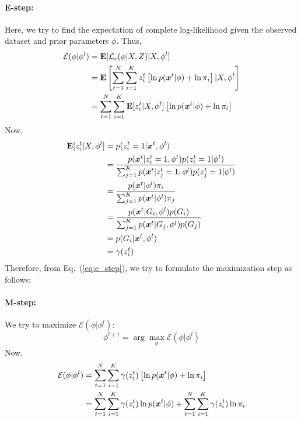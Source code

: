 \paragraph{E-step:} Here, we try to find the expectation of complete log-likelihood given the observed dataset and prior parameters $\phi$. Thus,
\begin{align}\label{eq:e_step}
	\mathcal{E}(\phi|\phi^l) &= \mathbf{E}[\mathcal{L}_c(\phi|X,Z)|X,\phi^l] \nonumber\\
	&= \mathbf{E}\left[\sum_{t=1}^{N} \sum_{i=1}^{K} z^t_i \left[\ln p(\boldsymbol{x}^t|\phi) + \ln \pi_i\right]|X,\phi^l\right] \nonumber\\
	&= \sum_{t=1}^{N} \sum_{i=1}^{K} \mathbf{E}[z^t_i|X,\phi^l]\left[\ln p(\boldsymbol{x}^t|\phi) + \ln \pi_i\right]
\end{align}
Now,
\begin{equation}
	\begin{split}
		\mathbf{E}[z^t_i|X,\phi^l] &= p(z^t_i = 1 | \boldsymbol{x}^t, \phi^l)\\
		&= \frac{p(\boldsymbol{x}^t|z^t_i=1,\phi^l)p(z^t_i=1|\phi^l)}{\sum_{j=1}^{K}p(\boldsymbol{x}^t|z^t_j=1,\phi^l)p(z^t_j=1|\phi^l)}\\
		&= \frac{p(\boldsymbol{x}^t|\phi^l)\pi_i}{\sum_{j=1}^{K} p(\boldsymbol{x}^t|\phi^l)\pi_j}\\
		&= \frac{p(\boldsymbol{x}^t|G_i,\phi^l)p(G_i)}{\sum_{j=1}^{K}p(\boldsymbol{x}^t|G_j,\phi^l)p(G_j)}\\
		&= p(G_i|\boldsymbol{x}^t, \phi^l)\\
		&= \gamma(z^t_i)
	\end{split}
\end{equation}
Therefore, from Eq.~(\ref{eq:e_step}), we try to formulate the maximization step as follows:
\paragraph{M-step:} We try to maximize $\mathcal{E}(\phi|\phi^l)$:
\begin{equation*}
	\phi^{l+1} = \arg \max_{\phi} \mathcal{E}(\phi|\phi^l)
\end{equation*}
Now,
\begin{equation}\label{eq:cost_func}
	\begin{split}
		\mathcal{E}(\phi|\phi^l) &= \sum_{t=1}^{N} \sum_{i=1}^{K} \gamma(z^t_i)\left[\ln p(\boldsymbol{x}^t|\phi) + \ln \pi_i\right] \\
		&= \sum_{t=1}^{N} \sum_{i=1}^{K} \gamma(z^t_i)\ln p(\boldsymbol{x}^t|\phi) + \sum_{t=1}^{N} \sum_{i=1}^{K} \gamma(z^t_i)\ln \pi_i
	\end{split}
\end{equation}
